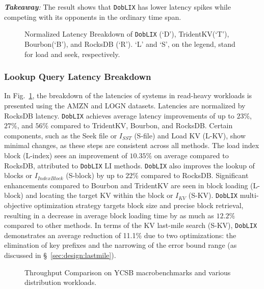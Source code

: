 \vspace{1pt}
\noindent\textit{\small\textbf{Takeaway}:} The result shows that \texttt{DobLIX} has lower latency spikes while competing with its opponents in the ordinary time span. 

\begin{figure}[t]
  \centering
  \vspace{-2em}
  \caption{\small{Normalized Latency Breakdown of \texttt{DobLIX} (`D'), TridentKV(`T'), Bourbon(`B'), and RocksDB (`R'). `L' and `S', on the legend, stand for load and seek, respectively.}}
  \label{fig:eval-breakup}
  \vspace{-2em}
\end{figure}

\subsubsection{\textbf{Lookup Query Latency Breakdown}}
\label{sec:eval:breakdown}
In Fig.~\ref{fig:eval-breakup}, the breakdown of the latencies of systems in read-heavy workloads is presented using the AMZN and LOGN datasets. Latencies are normalized by RocksDB latency.
\texttt{DobLIX} achieves average latency improvements of up to $23\%$, $27\%$, and $56\%$ compared to TridentKV, Bourbon, and RocksDB. Certain components, such as the Seek file or $I_{SST}$ (S-file) and Load KV (L-KV), show minimal changes, as these steps are consistent across all methods. The load index block (L-index) sees an improvement of $10.35\%$ on average compared to RocksDB, attributed to \texttt{DobLIX} LI methods. \texttt{DobLIX} also improves the lookup of blocks or $I_{IndexBlock}$ (S-block) by up to $22\%$ compared to RocksDB. Significant enhancements compared to Bourbon and TridentKV are seen in block loading (L-block) and locating the target KV within the block or $I_{KV}$ (S-KV). \texttt{DobLIX} multi-objective optimization strategy targets block size and precise block retrieval, resulting in a decrease in average block loading time by as much as $12.2\%$ compared to other methods. In terms of the KV last-mile search (S-KV), \texttt{DobLIX} demonstrates an average reduction of 11.1\% due to two optimizations: the elimination of key prefixes and the narrowing of the error bound range (as discussed in \S~\ref{sec:design:lastmile}).

\begin{figure}[t]
  \centering
  \vspace{-2em}
  \caption{\small Throughput Comparison on YCSB macrobenchmarks and various distribution workloads.}
  \label{fig:ycsb-distr}
  \vspace{-1em}
\end{figure}

